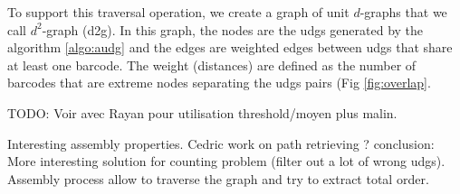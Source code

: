 To support this traversal operation, we create a graph of unit $d$-graphs that we call $d^2$-graph (d2g).
In this graph, the nodes are the udgs generated by the algorithm \ref{algo:audg} and the edges are weighted edges between udgs that share at least one barcode.
The weight (distances) are defined as the number of barcodes that are extreme nodes separating the udgs pairs (Fig \ref{fig:overlap}.

TODO: Voir avec Rayan pour utilisation threshold/moyen plus malin.


Interesting assembly properties.
Cedric work on path retrieving ?
conclusion: More interesting solution for counting problem (filter out a lot of wrong udgs).
Assembly process allow to traverse the graph and try to extract total order.